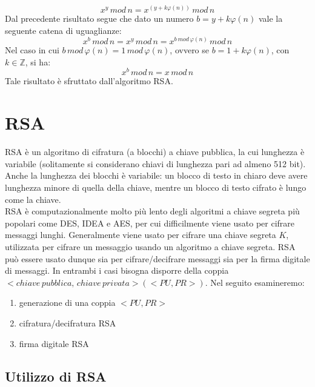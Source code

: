 \begin{equation}
x^y \, mod \, n = x^{(y + k\varphi(n) )} \, mod \, n
\end{equation} 
Dal precedente risultato segue che dato un numero $b = y + k\varphi(n)$ vale la seguente catena di uguaglianze:
\[
x^{b} \, mod \, n = x^{y} \, mod \, n = x^{b \, mod \, \varphi(n)} \, mod \, n
\]
Nel caso in cui $ b \, mod \, \varphi(n) = 1 \, mod \, \varphi(n) $, ovvero se $b = 1 + k \varphi(n) $, con $k \in \mathbb{Z}$, si ha:
\begin{equation}
x^b \, mod \, n = x \, mod \, n
\end{equation}
Tale risultato è sfruttato dall'algoritmo RSA.

\section{RSA}

RSA è un algoritmo di cifratura (a blocchi) a chiave pubblica, la cui lunghezza è variabile (solitamente si considerano chiavi di lunghezza pari ad almeno 512 bit). Anche la lunghezza dei blocchi è variabile: un blocco di testo in chiaro deve avere lunghezza minore di quella della chiave, mentre un blocco di testo cifrato è lungo come la chiave. \\
RSA è computazionalmente molto più lento degli algoritmi a chiave segreta più popolari come DES, IDEA e AES, per cui difficilmente viene usato per cifrare messaggi lunghi. Generalmente viene usato per cifrare una chiave segreta $K$, utilizzata per cifrare un messaggio usando un algoritmo a chiave segreta. RSA può essere usato dunque sia per cifrare/decifrare messaggi sia per la firma digitale di messaggi. In entrambi i casi bisogna disporre della coppia $<chiave \, pubblica, \,  chiave \, privata>(<PU,PR>)$. Nel seguito esamineremo:
\begin{enumerate}
\item generazione di una coppia $<PU,PR>$
\item cifratura/decifratura RSA
\item firma digitale RSA
\end{enumerate}

\subsection{Utilizzo di RSA} \label{sec:ut_rsa}

